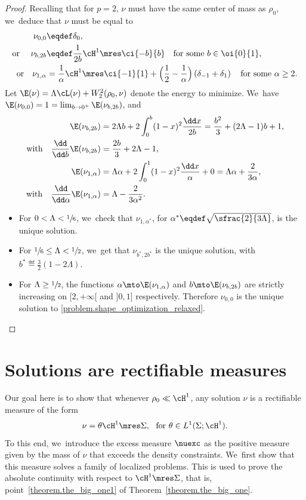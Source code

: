 \begin{proof}
Recalling that for $p=2$, $\nu$ must have the same center of mass as $\rho_0$, we~deduce that $\nu$ must be equal to
\begin{align*}
\nu_{0,0} &\eqdef\delta_0,\\
\mbox{or }\quad
\nu_{b,2b}&\eqdef \frac{1}{2b}\cH^1\mres\ci{-b}{b}\quad\mbox{for some $b \in \oi{0}{1}$},\\
\mbox{or}\quad \nu_{1,\alpha} &= \frac{1}{\alpha}\cH^1\mres\ci{-1}{1} + \Bigl(\frac{1}{2}-\frac{1}{\alpha}\Bigr)\left(\delta_{-1}+\delta_{1}\right)\quad \mbox{for some $\alpha\geq 2$.}
\end{align*}
Let $\E(\nu)= \Lambda \cL(\nu)+W_2^2(\rho_0,\nu)$ denote the energy to minimize. We~have $\E(\nu_{0,0})=1 = \lim_{b \to 0^+} \E(\nu_{b,2b})$, and
\begin{align*}
\E(\nu_{b,2b})&= 2\Lambda b + 2 \int_0^b (1-x)^2\frac{\dd x}{2b} = \frac{b^2}{3}+ (2\Lambda-1)b+1,\\
\mbox{with}\quad \frac{\dd}{\dd b}\E(\nu_{b,2b}) &= \frac{2b}{3}+2\Lambda-1,\\
\E(\nu_{1,\alpha})&= \Lambda \alpha + 2\int_0^1(1-x)^2\frac{\dd x}{\alpha}+0 = \Lambda \alpha +\frac{2}{3\alpha},\\
\mbox{with}\quad \frac{\dd}{\dd \alpha}\E(\nu_{1,\alpha}) &= \Lambda - \frac{2}{3\alpha^2}.
\end{align*}

\begin{itemize}
\item
For $0<\Lambda<\sfrac{1}{6}$, we~check that $\nu_{1,\alpha^*}$, for $\alpha^*\eqdef \sqrt{\sfrac{2}{3\Lambda}}$, is the unique solution.

\item
For $\sfrac{1}{6}\le \Lambda < \sfrac{1}{2}$, we~get that $\nu_{b^*,2b^*}$ is the unique solution, with $b^*\eqdef \frac{3}{2}(1-2\Lambda)$.

\item
For $\Lambda \geq \sfrac{1}{2}$, the functions $\alpha\mto \E(\nu_{1,\alpha})$ and $b\mto \E(\nu_{b,2b})$ are strictly increasing on $[2,+\infty[$ and $]0,1]$ respectively. Therefore $\nu_{0,0}$ is the unique solution to \eqref{problem.shape_optimization_relaxed}.\qedhere
\end{itemize}
\end{proof}

\section{Solutions are rectifiable measures}\label{section.solutions_are_absolutely_continuous}
Our goal here is to show that whenever $\rho_0 \ll \cH^1$, any solution $\nu$ is a rectifiable measure
of the form
\[
\nu = \theta \cH^1\mres \Sigma, \ \text{ for $\theta \in L^1(\Sigma; \cH^1)$}.
\]
To this end, we~introduce the excess measure $\nuexc$ as the positive measure given by the mass of $\nu$ that exceeds the density constraints. We~first show that this measure solves a family of localized problems. This is used to prove the absolute continuity with respect to $\cH^1\mres\Sigma$, that is, point~\eqref{theorem.the_big_one1} of Theorem~\ref{theorem.the_big_one}.

